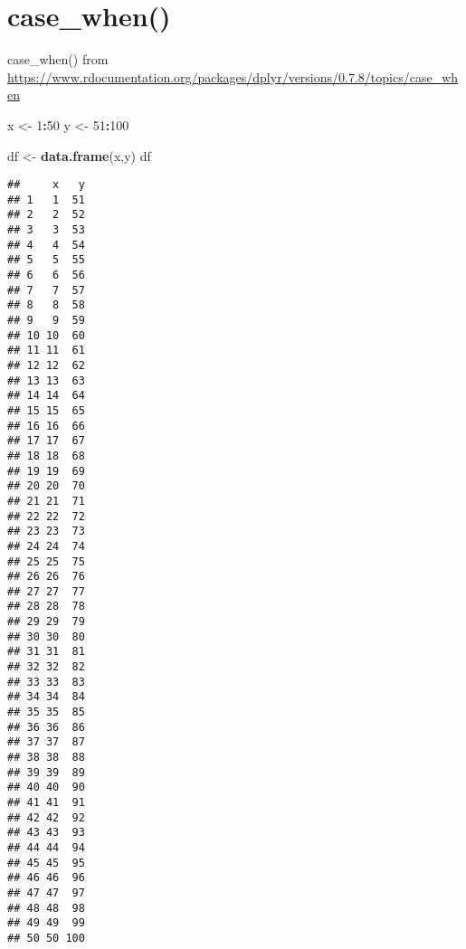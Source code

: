 \documentclass[]{book}
\newenvironment{Shaded}{\begin{snugshade}}{\end{snugshade}}
\newcommand{\DecValTok}[1]{\textcolor[rgb]{0.00,0.00,0.81}{#1}}
\newcommand{\KeywordTok}[1]{\textcolor[rgb]{0.13,0.29,0.53}{\textbf{#1}}}
\newcommand{\NormalTok}[1]{#1}
\newcommand{\OperatorTok}[1]{\textcolor[rgb]{0.81,0.36,0.00}{\textbf{#1}}}
\newcommand{\OtherTok}[1]{\textcolor[rgb]{0.56,0.35,0.01}{#1}}
\newcommand{\StringTok}[1]{\textcolor[rgb]{0.31,0.60,0.02}{#1}}
\begin{document}
\hypertarget{case_when}{%
\section{case\_when()}\label{case_when}}

case\_when() from \url{https://www.rdocumentation.org/packages/dplyr/versions/0.7.8/topics/case_when}

\begin{Shaded}
\begin{Highlighting}[]
\NormalTok{x <-}\StringTok{ }\DecValTok{1}\OperatorTok{:}\DecValTok{50}
\NormalTok{y <-}\StringTok{ }\DecValTok{51}\OperatorTok{:}\DecValTok{100}

\NormalTok{df <-}\StringTok{ }\KeywordTok{data.frame}\NormalTok{(x,y)}
\NormalTok{df}
\end{Highlighting}
\end{Shaded}

\begin{verbatim}
##     x   y
## 1   1  51
## 2   2  52
## 3   3  53
## 4   4  54
## 5   5  55
## 6   6  56
## 7   7  57
## 8   8  58
## 9   9  59
## 10 10  60
## 11 11  61
## 12 12  62
## 13 13  63
## 14 14  64
## 15 15  65
## 16 16  66
## 17 17  67
## 18 18  68
## 19 19  69
## 20 20  70
## 21 21  71
## 22 22  72
## 23 23  73
## 24 24  74
## 25 25  75
## 26 26  76
## 27 27  77
## 28 28  78
## 29 29  79
## 30 30  80
## 31 31  81
## 32 32  82
## 33 33  83
## 34 34  84
## 35 35  85
## 36 36  86
## 37 37  87
## 38 38  88
## 39 39  89
## 40 40  90
## 41 41  91
## 42 42  92
## 43 43  93
## 44 44  94
## 45 45  95
## 46 46  96
## 47 47  97
## 48 48  98
## 49 49  99
## 50 50 100
\end{verbatim}

\begin{Shaded}
\end{Shaded}
\end{document}
